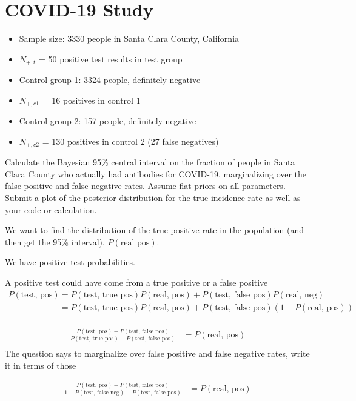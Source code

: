 \section{COVID-19 Study}
\begin{itemize}
    \item Sample size: 3330 people in Santa Clara County, California
    \item $N_{+,t}$ = 50 positive test results in test group
    \item Control group 1: 3324 people, definitely negative
    \item $N_{+,c1}$ = 16 positives in control 1
    \item Control group 2: 157 people, definitely negative
    \item $N_{+,c2}$ = 130 positives in control 2 (27 false negatives)
\end{itemize}

Calculate the Bayesian 95\% central interval on the fraction of people in Santa Clara County who actually had antibodies for COVID-19, marginalizing over the false positive and false negative rates. Assume flat priors on all parameters. Submit a plot of the posterior distribution for the true incidence rate as well as your code or calculation.

We want to find the distribution of the true positive rate in the population (and then get the 95\% interval), $P(\text{real pos})$.

We have positive test probabilities.

A positive test could have come from a true positive or a false positive
\begin{align*}
    P(\text{test, pos}) &= P(\text{test, true pos})P(\text{real, pos}) + P(\text{test, false pos})P(\text{real, neg}) \\
    &= P(\text{test, true pos})P(\text{real, pos}) + P(\text{test, false pos})(1 - P(\text{real, pos})) \\
\end{align*}

\begin{align*}
    \frac{P(\text{test, pos}) - P(\text{test, false pos})}{P(\text{test, true pos}) - P(\text{test, false pos})} &= P(\text{real, pos}) \\
\end{align*}
The question says to marginalize over false positive and false negative rates, write it in terms of those

\begin{align*}
    \frac{P(\text{test, pos}) - P(\text{test, false pos})}{1-P(\text{test, false neg}) - P(\text{test, false pos})} &= P(\text{real, pos}) \\
\end{align*}


